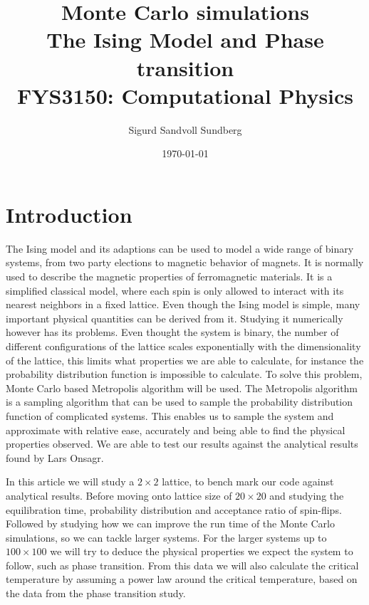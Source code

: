 \documentclass[%
reprint,
nofootinbib,
amsmath,amssymb,
aps,
]{revtex4-1}
\begin{document}
	
\title{Monte Carlo simulations\\
	\normalsize{The Ising Model and Phase transition} \\
	\hrulefill\small{ FYS3150: Computational Physics }\hrulefill}

\author{Sigurd Sandvoll Sundberg}

%

\date{\today}

\begin{abstract}%

\end{abstract}

\maketitle 

\section{Introduction} %
The Ising model and its adaptions can be used to model a wide range of binary systems, from two party elections to magnetic behavior of magnets. It is normally used to describe the magnetic properties of ferromagnetic materials. It is a simplified classical model, where each spin is only allowed to interact with its nearest neighbors in a fixed lattice. Even though the Ising model is simple, many important physical quantities can be derived from it. Studying it numerically however has its problems. Even thought the system is binary, the number of different configurations of the lattice scales exponentially with the dimensionality of the lattice, this limits what properties we are able to calculate, for instance the probability distribution function is impossible to calculate. To solve this problem, Monte Carlo based Metropolis algorithm will be used. The Metropolis algorithm is a sampling algorithm that can be used to sample the probability distribution function of complicated systems. This enables us to sample the system and approximate with relative ease, accurately and being able to find the physical properties observed. We are able to test our results against the analytical results found by Lars Onsagr\cite{LarsOnsager}. 

In this article we will study a $2\times 2$ lattice, to bench mark our code against analytical results. Before moving onto  lattice size of $20\times 20$ and studying the equilibration time, probability distribution and acceptance ratio of spin-flips. Followed by studying how we can improve the run time of the Monte Carlo simulations, so we can tackle larger systems. For the larger systems up to $100 \times 100$ we will try to deduce the physical properties we expect the system to follow, such as phase transition. From this data we will also calculate the critical temperature by assuming a power law around the critical temperature, based on the data from the phase transition study. 
\end{document}
